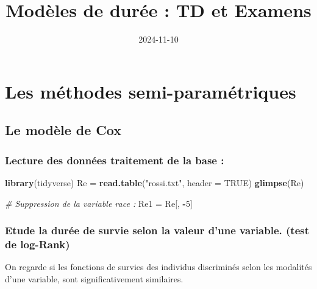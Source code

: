 \documentclass[
]{article}
\title{Modèles de durée : TD et Examens}
\author{}
\date{\vspace{-2.5em}2024-11-10}
\newenvironment{Shaded}{\begin{snugshade}}{\end{snugshade}}
\newcommand{\AttributeTok}[1]{\textcolor[rgb]{0.13,0.29,0.53}{#1}}
\newcommand{\CommentTok}[1]{\textcolor[rgb]{0.56,0.35,0.01}{\textit{#1}}}
\newcommand{\ConstantTok}[1]{\textcolor[rgb]{0.56,0.35,0.01}{#1}}
\newcommand{\DecValTok}[1]{\textcolor[rgb]{0.00,0.00,0.81}{#1}}
\newcommand{\FunctionTok}[1]{\textcolor[rgb]{0.13,0.29,0.53}{\textbf{#1}}}
\newcommand{\NormalTok}[1]{#1}
\newcommand{\OtherTok}[1]{\textcolor[rgb]{0.56,0.35,0.01}{#1}}
\newcommand{\SpecialCharTok}[1]{\textcolor[rgb]{0.81,0.36,0.00}{\textbf{#1}}}
\newcommand{\StringTok}[1]{\textcolor[rgb]{0.31,0.60,0.02}{#1}}
\begin{document}
\maketitle

{
\setcounter{tocdepth}{3}
\tableofcontents
}
\hypertarget{les-muxe9thodes-semi-paramuxe9triques}{%
\section{Les méthodes
semi-paramétriques}\label{les-muxe9thodes-semi-paramuxe9triques}}

\hypertarget{le-moduxe8le-de-cox}{%
\subsection{Le modèle de Cox}\label{le-moduxe8le-de-cox}}

\hypertarget{lecture-des-donnuxe9es-traitement-de-la-base}{%
\subsubsection{Lecture des données traitement de la base
:}\label{lecture-des-donnuxe9es-traitement-de-la-base}}

\begin{Shaded}
\begin{Highlighting}[]
\FunctionTok{library}\NormalTok{(tidyverse)}
\NormalTok{Re }\OtherTok{=} \FunctionTok{read.table}\NormalTok{(}\StringTok{"rossi.txt"}\NormalTok{, }\AttributeTok{header =} \ConstantTok{TRUE}\NormalTok{)}
\FunctionTok{glimpse}\NormalTok{(Re)}

\CommentTok{\# Suppression de la variable race : }
\NormalTok{Re1 }\OtherTok{=}\NormalTok{ Re[, }\SpecialCharTok{{-}}\DecValTok{5}\NormalTok{]}
\end{Highlighting}
\end{Shaded}

\hypertarget{etude-la-duruxe9e-de-survie-selon-la-valeur-dune-variable.-test-de-log-rank}{%
\subsubsection{Etude la durée de survie selon la valeur d'une variable.
(test de
log-Rank)}\label{etude-la-duruxe9e-de-survie-selon-la-valeur-dune-variable.-test-de-log-rank}}

On regarde si les fonctions de survies des individus discriminés selon
les modalités d'une variable, sont significativement similaires.
\end{document}
